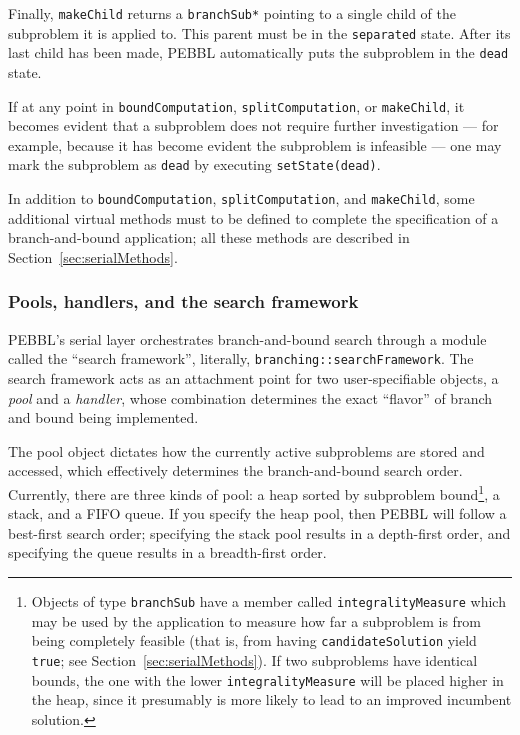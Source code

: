 Finally, \texttt{makeChild} returns a \texttt{branchSub*} pointing to
a single child of the subproblem it is applied to.  This parent must
be in the \texttt{separated} state.  After its last child has been
made, PEBBL automatically puts the subproblem in the \texttt{dead}
state.

If at any point in \texttt{boundComputation},
\texttt{splitComputation}, or \texttt{makeChild}, it becomes evident
that a subproblem does not require further investigation --- for
example, because it has become evident the subproblem is infeasible
--- one may mark the subproblem as \texttt{dead} by executing
\texttt{setState(dead)}.

In addition to \texttt{boundComputation}, \texttt{splitComputation},
and \texttt{makeChild}, some additional virtual methods must to be
defined to complete the specification of a branch-and-bound
application; all these methods are described in
Section~\ref{sec:serialMethods}.


\subsubsection{Pools, handlers, and the search framework}
\label{sec:framework}

PEBBL's serial layer orchestrates branch-and-bound search through a
module called the ``search framework'', literally,
\texttt{branching::searchFramework}.  The search framework acts as an
attachment point for two user-specifiable objects, a \emph{pool} and
a \emph{handler}, whose combination determines the exact ``flavor''
of branch and bound being implemented.

The pool object dictates how the currently active subproblems are
stored and accessed, which effectively determines the branch-and-bound
search order.  Currently, there are three kinds of pool: a heap sorted
by subproblem bound\footnote{Objects of type \texttt{branchSub} have a
member called \texttt{integralityMeasure} which may be used by the
application to measure how far a subproblem is from being completely
feasible (that is, from having \texttt{candidateSolution} yield
\texttt{true}; see Section~\ref{sec:serialMethods}).  If two
subproblems have identical bounds, the one with the lower
\texttt{integralityMeasure} will be placed higher in the heap, since
it presumably is more likely to lead to an improved incumbent
solution.}, a stack, and a FIFO queue.  If you specify the heap
pool, then PEBBL will follow a best-first search order; specifying the
stack pool results in a depth-first order, and specifying the queue
results in a breadth-first order. 

